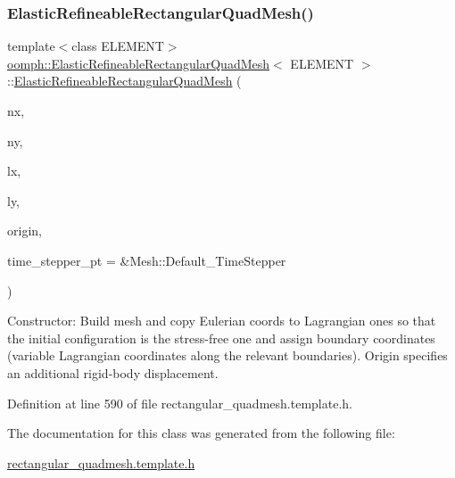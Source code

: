 \subsubsection{\texorpdfstring{Elastic\+Refineable\+Rectangular\+Quad\+Mesh()}{ElasticRefineableRectangularQuadMesh()}\hspace{0.1cm}{\footnotesize\ttfamily [3/3]}}
{\footnotesize\ttfamily template$<$class E\+L\+E\+M\+E\+NT$>$ \\
\hyperlink{classoomph_1_1ElasticRefineableRectangularQuadMesh}{oomph\+::\+Elastic\+Refineable\+Rectangular\+Quad\+Mesh}$<$ E\+L\+E\+M\+E\+NT $>$\+::\hyperlink{classoomph_1_1ElasticRefineableRectangularQuadMesh}{Elastic\+Refineable\+Rectangular\+Quad\+Mesh} (\begin{DoxyParamCaption}\item[{const unsigned \&}]{nx,  }\item[{const unsigned \&}]{ny,  }\item[{const double \&}]{lx,  }\item[{const double \&}]{ly,  }\item[{const Vector$<$ double $>$ \&}]{origin,  }\item[{Time\+Stepper $\ast$}]{time\+\_\+stepper\+\_\+pt = {\ttfamily \&Mesh\+:\+:Default\+\_\+TimeStepper} }\end{DoxyParamCaption})\hspace{0.3cm}{\ttfamily [inline]}}



Constructor\+: Build mesh and copy Eulerian coords to Lagrangian ones so that the initial configuration is the stress-\/free one and assign boundary coordinates (variable Lagrangian coordinates along the relevant boundaries). Origin specifies an additional rigid-\/body displacement. 



Definition at line 590 of file rectangular\+\_\+quadmesh.\+template.\+h.



The documentation for this class was generated from the following file\+:\begin{DoxyCompactItemize}
\item 
\hyperlink{rectangular__quadmesh_8template_8h}{rectangular\+\_\+quadmesh.\+template.\+h}\end{DoxyCompactItemize}
